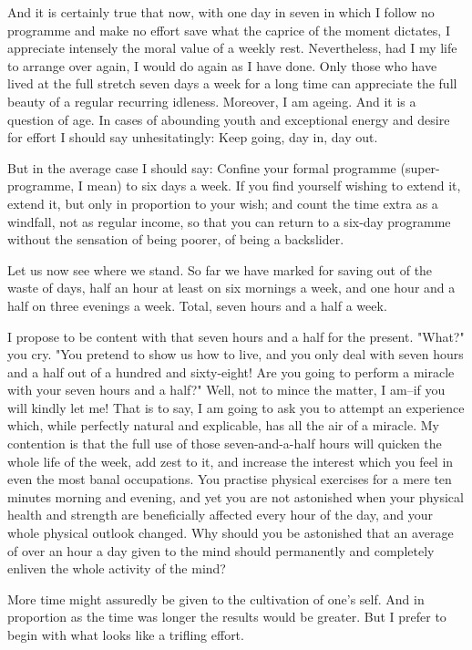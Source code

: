 And it is certainly true that now, with one day in seven in which I
follow no programme and make no effort save what the caprice of the
moment dictates, I appreciate intensely the moral value of a weekly
rest.  Nevertheless, had I my life to arrange over again, I would do
again as I have done.  Only those who have lived at the full stretch
seven days a week for a long time can appreciate the full beauty of a
regular recurring idleness.  Moreover, I am ageing.  And it is a
question of age.  In cases of abounding youth and exceptional energy
and desire for effort I should say unhesitatingly:  Keep going, day in,
day out.

But in the average case I should say:  Confine your formal programme
(super-programme, I mean) to six days a week.  If you find yourself
wishing to extend it, extend it, but only in proportion to your wish;
and count the time extra as a windfall, not as regular income, so that
you can return to a six-day programme without the sensation of being
poorer, of being a backslider.

Let us now see where we stand.  So far we have marked for saving out of
the waste of days, half an hour at least on six mornings a week, and
one hour and a half on three evenings a week.  Total, seven hours and a
half a week.

I propose to be content with that seven hours and a half for the
present.  "What?" you cry.  "You pretend to show us how to live, and
you only deal with seven hours and a half out of a hundred and
sixty-eight!  Are you going to perform a miracle with your seven hours
and a half?"  Well, not to mince the matter, I am--if you will kindly
let me!  That is to say, I am going to ask you to attempt an experience
which, while perfectly natural and explicable, has all the air of a
miracle.  My contention is that the full use of those seven-and-a-half
hours will quicken the whole life of the week, add zest to it, and
increase the interest which you feel in even the most banal
occupations.  You practise physical exercises for a mere ten minutes
morning and evening, and yet you are not astonished when your physical
health and strength are beneficially affected every hour of the day,
and your whole physical outlook changed.  Why should you be astonished
that an average of over an hour a day given to the mind should
permanently and completely enliven the whole activity of the mind?

More time might assuredly be given to the cultivation of one's self.
And in proportion as the time was longer the results would be greater.
But I prefer to begin with what looks like a trifling effort.

